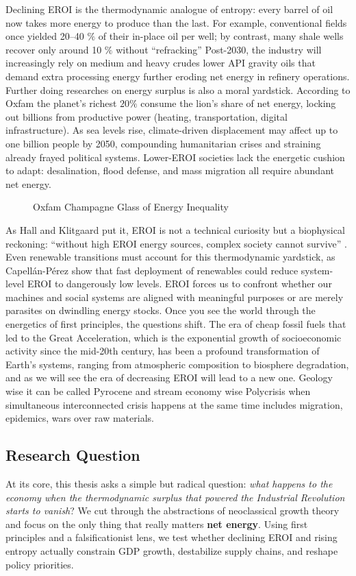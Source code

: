 \documentclass[a4paper,12pt]{article}
\begin{document}
Declining EROI is the thermodynamic analogue of entropy: every barrel of oil now takes more energy to produce than the last.  For example, conventional fields once yielded 20–40 $\%$ of their in-place oil per well; by contrast, many shale wells recover only around 10 $\%$ without “refracking” Post-2030, the industry will increasingly rely on medium and heavy crudes lower API gravity oils that demand extra processing energy further eroding net energy in refinery operations.
Further doing researches on energy surplus is also a moral yardstick. According to Oxfam the planet’s richest $20\%$ consume the lion’s share of net energy, locking out billions from productive power (heating, transportation, digital infrastructure). As sea levels rise, climate-driven displacement may affect up to one billion people by 2050, compounding humanitarian crises and straining already frayed political systems. Lower-EROI societies lack the energetic cushion to adapt: desalination, flood defense, and mass migration all require abundant net energy.
\begin{figure}[h!]
    \centering
    
    \caption{Oxfam Champagne Glass of Energy Inequality}
\end{figure}
As Hall and Klitgaard put it, EROI is not a technical curiosity but a biophysical reckoning: “without high EROI energy sources, complex society cannot survive” \citep{hall2012energy}. Even renewable transitions must account for this thermodynamic yardstick, as Capellán-Pérez \citeyearpar{capellan2019} show that fast deployment of renewables could reduce system-level EROI to dangerously low levels.
EROI forces us to confront whether our machines and social systems are aligned with meaningful purposes or are merely parasites on dwindling energy stocks. Once you see the world through the energetics of first principles, the questions shift. The era of cheap fossil fuels that led to the Great Acceleration, which is the exponential growth of socioeconomic activity since the mid-20th century, has been a profound transformation of Earth’s systems, ranging from atmospheric composition to biosphere degradation, and as we will see the era of decreasing EROI will lead to a new one. Geology wise it can be called Pyrocene and stream economy wise Polycrisis when simultaneous interconnected crisis happens at the same time includes migration, epidemics, wars over raw materials. 

\subsection{Research Question}
At its core, this thesis asks a simple but radical question: \textit{what happens to the economy when the thermodynamic surplus that powered the Industrial Revolution starts to vanish}? We cut through the abstractions of neoclassical growth theory and focus on the only thing that really matters \textbf{net energy}. Using first principles and a falsificationist lens, we test whether declining EROI and rising entropy actually constrain GDP growth, destabilize supply chains, and reshape policy priorities.
\end{document}
